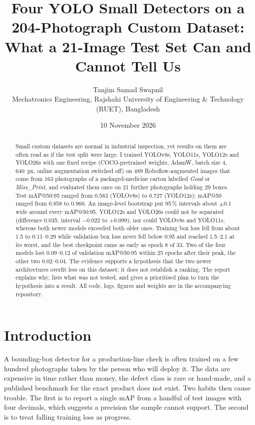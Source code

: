 \documentclass[11pt,a4paper]{article}
\title{\textbf{Four YOLO Small Detectors on a 204-Photograph Custom Dataset:\\ What a 21-Image Test Set Can and Cannot Tell Us}}
\author{Tanjim Samad Swapnil\\[2pt]
{\small Mechatronics Engineering, Rajshahi University of Engineering \& Technology (RUET), Bangladesh}}
\date{10 November 2026}
\begin{document}
\maketitle

\begin{abstract}
\noindent Small custom datasets are normal in industrial inspection, yet results on them are often read as if the test split were large. I trained YOLOv8s, YOLO11s, YOLO12s and YOLO26s with one fixed recipe (COCO-pretrained weights, AdamW, batch size 4, 640~px, online augmentation switched off) on 489 Roboflow-augmented images that come from 163 photographs of a packaged-medicine carton labelled \emph{Good} or \emph{Miss\_Print}, and evaluated them once on 21 further photographs holding 29 boxes. Test mAP@50:95 ranged from 0.583 (YOLOv8s) to 0.727 (YOLO12s); mAP@50 ranged from 0.858 to 0.960. An image-level bootstrap put 95\,\% intervals about $\pm$0.1 wide around every mAP@50:95. YOLO12s and YOLO26s could not be separated (difference 0.035, interval $-$0.022 to $+$0.099), nor could YOLOv8s and YOLO11s, whereas both newer models exceeded both older ones. Training box loss fell from about 1.5 to 0.11--0.29 while validation box loss never fell below 0.95 and reached 1.5--2.1 at its worst, and the best checkpoint came as early as epoch 8 of 33. Two of the four models lost 0.09--0.12 of validation mAP@50:95 within 25 epochs after their peak, the other two 0.02--0.04. The evidence supports a hypothesis that the two newer architectures overfit less on this dataset; it does not establish a ranking. The report explains why, lists what was not tested, and gives a prioritised plan to turn the hypothesis into a result. All code, logs, figures and weights are in the accompanying repository.
\end{abstract}

\section{Introduction}
A bounding-box detector for a production-line check is often trained on a few hundred photographs taken by the person who will deploy it. The data are expensive in time rather than money, the defect class is rare or hand-made, and a published benchmark for the exact product does not exist. Two habits then cause trouble. The first is to report a single mAP from a handful of test images with four decimals, which suggests a precision the sample cannot support. The second is to treat falling training loss as progress.
\end{document}

